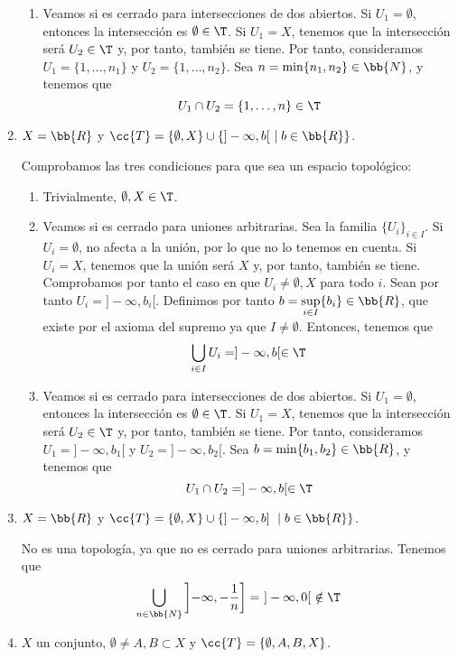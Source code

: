 \begin{ejercicio}
\begin{enumerate}[label=\alph*)]
\begin{enumerate}
            \item Veamos si es cerrado para intersecciones de dos abiertos. Si $U_1=\emptyset$, entonces la intersección es $\emptyset\in \T$. Si $U_1=X$, tenemos que la intersección será $U_2\in \T$ y, por tanto, también se tiene. Por tanto, consideramos $U_1=\{1,\dots,n_1\}$ y $U_2=\{1,\dots, n_2\}$. Sea $n=\min\{n_1, n_2\}\in \bb{N}$, y tenemos que
            $$U_1\cap U_2 = \{1,\dots, n\}\in \T$$
        \end{enumerate}

        \item $X=\bb{R}$ y $\cc{T}=\{\emptyset, X\}\cup \left\{]-\infty, b[~\mid b\in \bb{R}\right\}$.

        Comprobamos las tres condiciones para que sea un espacio topológico:
        \begin{enumerate}
            \item Trivialmente, $\emptyset, X\in \T$.
            \item Veamos si es cerrado para uniones arbitrarias. Sea la familia $\{U_i\}_{i\in I}$. Si $U_i=\emptyset$, no afecta a la unión, por lo que no lo tenemos en cuenta. Si $U_i=X$, tenemos que la unión será $X$ y, por tanto, también se tiene. Comprobamos por tanto el caso en que $U_i\neq \emptyset, X$ para todo $i$. Sean por tanto $U_i=]-\infty, b_i[$. Definimos por tanto $b=\sup\limits_{i\in I}\{b_i\}\in \bb{R}$, que existe por el axioma del supremo ya que $I\neq \emptyset$. Entonces, tenemos que
            $$\bigcup_{i\in I}U_i = ]-\infty,b[\in \T$$

            \item Veamos si es cerrado para intersecciones de dos abiertos. Si $U_1=\emptyset$, entonces la intersección es $\emptyset\in \T$. Si $U_1=X$, tenemos que la intersección será $U_2\in \T$ y, por tanto, también se tiene. Por tanto, consideramos $U_1=]-\infty, b_1[$ y $U_2=]-\infty, b_2[$. Sea $b=\min\{b_1, b_2\}\in \bb{R}$, y tenemos que
            $$U_1\cap U_2 = ]-\infty, b[\in \T$$
        \end{enumerate}

        \item $X=\bb{R}$ y $\cc{T}=\{\emptyset, X\}\cup \left\{]-\infty, b]~\mid  b\in \bb{R}\right\}$.

        No es una topología, ya que no es cerrado para uniones arbitrarias. Tenemos que
        $$\bigcup_{n\in \bb{N}}\left]-\infty, -\frac{1}{n}\right]=~]-\infty, 0[~\notin \T$$

        \item $X$ un conjunto, $\emptyset\neq A,B\subset X$ y $\cc{T}=\{\emptyset, A, B, X\}$.


\end{enumerate}
\end{ejercicio}
